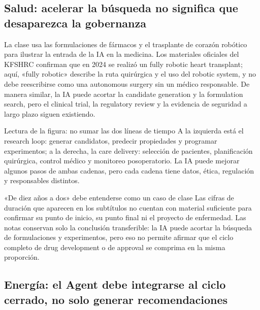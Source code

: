 \subsection{Salud: acelerar la búsqueda no significa que desaparezca la gobernanza}

La clase usa las formulaciones de fármacos y el trasplante de corazón robótico para ilustrar la entrada de la IA en la medicina. Los materiales oficiales del KFSHRC confirman que en 2024 se realizó un fully robotic heart transplant; aquí, «fully robotic» describe la ruta quirúrgica y el uso del robotic system, y no debe reescribirse como una autonomous surgery sin un médico responsable. De manera similar, la IA puede acortar la candidate generation y la formulation search, pero el clinical trial, la regulatory review y la evidencia de seguridad a largo plazo siguen existiendo.


\begin{knowledgebox}{Lectura de la figura: no sumar las dos líneas de tiempo}
A la izquierda está el research loop: generar candidatos, predecir propiedades y programar experimentos; a la derecha, la care delivery: selección de pacientes, planificación quirúrgica, control médico y monitoreo posoperatorio. La IA puede mejorar algunos pasos de ambas cadenas, pero cada cadena tiene datos, ética, regulación y responsables distintos.
\end{knowledgebox}

\begin{warningbox}{«De diez años a dos» debe entenderse como un caso de clase}
Las cifras de duración que aparecen en los subtítulos no cuentan con material suficiente para confirmar su punto de inicio, su punto final ni el proyecto de enfermedad. Las notas conservan solo la conclusión transferible: la IA puede acortar la búsqueda de formulaciones y experimentos, pero eso no permite afirmar que el ciclo completo de drug development o de approval se comprima en la misma proporción.
\end{warningbox}

\subsection{Energía: el Agent debe integrarse al ciclo cerrado, no solo generar recomendaciones}

